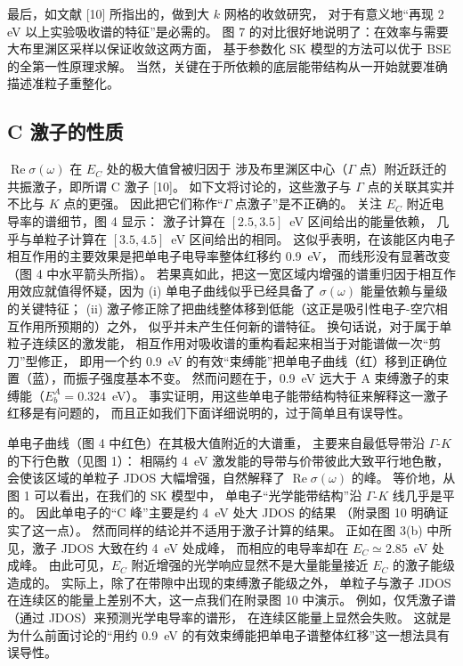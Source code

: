 \documentclass[11pt,a4paper]{ctexart}
\begin{document}
最后，如文献 [10] 所指出的，做到大 $k$ 网格的收敛研究，
对于有意义地“再现 2 eV 以上实验吸收谱的特征”是必需的。
图 7 的对比很好地说明了：在效率与需要大布里渊区采样以保证收敛这两方面，
基于参数化 SK 模型的方法可以优于 BSE 的全第一性原理求解。
当然，关键在于所依赖的底层能带结构从一开始就要准确描述准粒子重整化。

\subsection{C 激子的性质}

$\operatorname{Re}\sigma(\omega)$ 在 $E_C$ 处的极大值曾被归因于
涉及布里渊区中心（$\Gamma$ 点）附近跃迁的共振激子，即所谓 C 激子 [10]。
如下文将讨论的，这些激子与 $\Gamma$ 点的关联其实并不比与 $K$ 点的更强。
因此把它们称作“$\Gamma$ 点激子”是不正确的。
关注 $E_C$ 附近电导率的谱细节，图 4 显示：
激子计算在 $[2.5,3.5]$~eV 区间给出的能量依赖，
几乎与单粒子计算在 $[3.5,4.5]$~eV 区间给出的相同。
这似乎表明，在该能区内电子相互作用的主要效果是把单电子电导率整体红移约 0.9~eV，
而线形没有显著改变（图 4 中水平箭头所指）。
若果真如此，把这一宽区域内增强的谱重归因于相互作用效应就值得怀疑，因为
(i) 单电子曲线似乎已经具备了 $\sigma(\omega)$ 能量依赖与量级的关键特征；
(ii) 激子修正除了把曲线整体移到低能（这正是吸引性电子-空穴相互作用所预期的）之外，
似乎并未产生任何新的谱特征。
换句话说，对于属于单粒子连续区的激发能，
相互作用对吸收谱的重构看起来相当于对能谱做一次“剪刀”型修正，
即用一个约 0.9~eV 的有效“束缚能”把单电子曲线（红）移到正确位置（蓝），而振子强度基本不变。
然而问题在于，0.9~eV 远大于 A 束缚激子的束缚能（$E_b^A=0.324$~eV）。
事实证明，用这些单电子能带结构特征来解释这一激子红移是有问题的，
而且正如我们下面详细说明的，过于简单且有误导性。

单电子曲线（图 4 中红色）在其极大值附近的大谱重，
主要来自最低导带沿 $\Gamma$-$K$ 的下行色散（见图 1）：
相隔约 4~eV 激发能的导带与价带彼此大致平行地色散，
会使该区域的单粒子 JDOS 大幅增强，自然解释了 $\operatorname{Re}\sigma(\omega)$ 的峰。
等价地，从图 1 可以看出，在我们的 SK 模型中，
单电子“光学能带结构”沿 $\Gamma$-$K$ 线几乎是平的。
因此单电子的“C 峰”主要是约 4~eV 处大 JDOS 的结果
（附录图 10 明确证实了这一点）。
然而同样的结论并不适用于激子计算的结果。
正如在图 3(b) 中所见，激子 JDOS 大致在约 4~eV 处成峰，
而相应的电导率却在 $E_C\simeq2.85$~eV 处成峰。
由此可见，$E_C$ 附近增强的光学响应显然不是大量能量接近 $E_C$ 的激子能级造成的。
实际上，除了在带隙中出现的束缚激子能级之外，
单粒子与激子 JDOS 在连续区的能量上差别不大，这一点我们在附录图 10 中演示。
例如，仅凭激子谱（通过 JDOS）来预测光学电导率的谱形，
在连续区能量上显然会失败。
这就是为什么前面讨论的“用约 0.9~eV 的有效束缚能把单电子谱整体红移”这一想法具有误导性。
\end{document}
